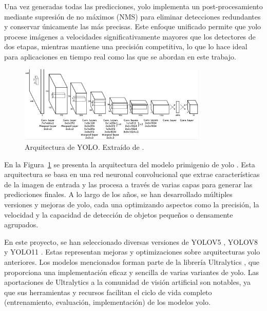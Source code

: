 \documentclass[11pt,spanish,listoffigures,listoftables]{tfgetsinf}
\begin{document}
Una vez generadas todas las predicciones, \gls{yolo} implementa un post-procesamiento mediante supresión de no máximos (NMS) para eliminar detecciones redundantes y conservar únicamente las más precisas. Este enfoque unificado permite que \gls{yolo} procese imágenes a velocidades significativamente mayores que los detectores de dos etapas, mientras mantiene una precisión competitiva, lo que lo hace ideal para aplicaciones en tiempo real como las que se abordan en este trabajo.

\begin{figure}[H]
   \centering
   \includegraphics[width=0.8\textwidth]{images/estado_del_arte/yolo_architecture.png}
   \caption[Arquitectura de YOLO]{Arquitectura de YOLO. Extraído de \cite[fig. 3, p. ~3]{redmon2016lookonceunifiedrealtime}.}
   \label{fig:yolo_architecture}
\end{figure}

En la Figura~\ref{fig:yolo_architecture} se presenta la arquitectura del modelo primigenio de \gls{yolo} \cite{redmon2016lookonceunifiedrealtime}. Esta arquitectura se basa en una red neuronal convolucional que extrae características de la imagen de entrada y las procesa a través de varias capas para generar las predicciones finales. A lo largo de los años, se han desarrollado múltiples versiones y mejoras de \gls{yolo}, cada una optimizando aspectos como la precisión, la velocidad y la capacidad de detección de objetos pequeños o densamente agrupados.

En este proyecto, se han seleccionado diversas versiones de YOLOV5 \cite{yolov5_ultralytics}, YOLOV8 \cite{yolov8_ultralytics} y YOLO11 \cite{yolo11_ultralytics}. Estas representan mejoras y optimizaciones sobre arquitecturas \gls{yolo} anteriores. Los modelos mencionados forman parte de la librería Ultralytics \cite{Jocher_Ultralytics_YOLO_2023}, que proporciona una implementación eficaz y sencilla de varias variantes de \gls{yolo}. Las aportaciones de Ultralytics a la comunidad de visión artificial son notables, ya que sus herramientas y recursos facilitan el ciclo de vida completo (entrenamiento, evaluación, implementación) de los modelos \gls{yolo}.
\end{document}
